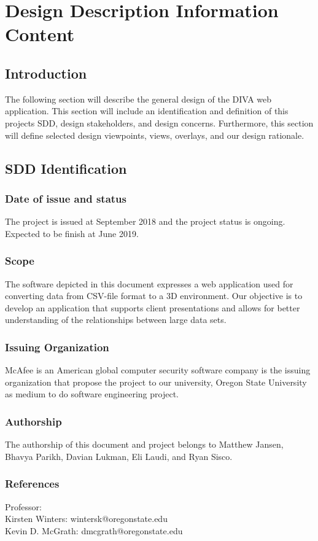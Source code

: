 \documentclass[journal,10pt,onecolumn,compsoc]{IEEEtran} \usepackage[margin=1.0in]{geometry} \usepackage{pdfpages}
\begin{document}
\section{Design Description Information Content}
    \subsection{Introduction}
    The following section will describe the general design of the DIVA web application. This section will include an identification and definition of this projects SDD, design stakeholders, and design concerns. Furthermore, this section will define selected design viewpoints, views, overlays, and our design rationale. 
    \subsection{SDD Identification}
        \subsubsection{Date of issue and status}
        The project is issued at September 2018 and the project status is ongoing. Expected to be finish at June 2019.
        \subsubsection{Scope}
        The software depicted in this document expresses a web application used for converting data from CSV-file format to a 3D environment. Our objective is to develop an application that supports client presentations and allows for better understanding of the relationships between large data sets.
        \subsubsection{Issuing Organization}
        McAfee is an American global computer security software company is the issuing organization that propose the project to our university, Oregon State University as medium to do software engineering project.
        \subsubsection{Authorship}
        The authorship of this document and project belongs to Matthew Jansen, Bhavya Parikh, Davian Lukman, Eli Laudi, and Ryan Sisco.
        \subsubsection{References}
        Professor:\\
        Kirsten Winters: wintersk@oregonstate.edu\\
        Kevin D. McGrath: dmcgrath@oregonstate.edu
\end{document}
